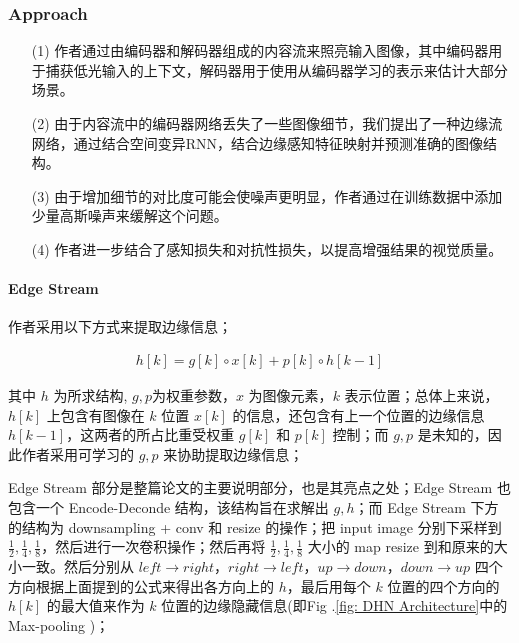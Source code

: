 \documentclass[a4paper, 10pt]{article}
\begin{document}
			\subsubsection{Approach}
			
			\begin{itemize}
				\item[(1)] 
				作者通过由编码器和解码器组成的内容流来照亮输入图像，其中编码器用于捕获低光输入的上下文，解码器用于使用从编码器学习的表示来估计大部分场景。
				
				\item[(2)]
				由于内容流中的编码器网络丢失了一些图像细节，我们提出了一种边缘流网络，通过结合空间变异RNN，结合边缘感知特征映射并预测准确的图像结构。
				
				\item[(3)]
				由于增加细节的对比度可能会使噪声更明显，作者通过在训练数据中添加少量高斯噪声来缓解这个问题。
				
				\item[(4)]
				作者进一步结合了感知损失和对抗性损失，以提高增强结果的视觉质量。
				
			\end{itemize}	
		
			\paragraph{Edge Stream}
			
			作者采用以下方式来提取边缘信息；
			
			\begin{equation}
				\begin{aligned}
					h \left[k\right] = g \left[k\right] \circ x \left[k\right] + p \left[k\right] \circ h \left[k-1\right]
				\end{aligned}
				\label{eq: max and avg}
			\end{equation}
			
		 	其中 $h$ 为所求结构, $g, p$为权重参数，$x$ 为图像元素，$k$ 表示位置；总体上来说，$h\left[k\right]$ 上包含有图像在 $k$ 位置 $x\left[k\right]$ 的信息，还包含有上一个位置的边缘信息 $h\left[k-1\right]$，这两者的所占比重受权重 $g\left[k\right]$ 和 $p\left[k\right]$ 控制；而 $g, p$ 是未知的，因此作者采用可学习的 $g, p$ 来协助提取边缘信息；
		 	
		 	Edge Stream 部分是整篇论文的主要说明部分，也是其亮点之处；Edge Stream 也包含一个 Encode-Deconde 结构，该结构旨在求解出 $g, h$；而 Edge Stream 下方的结构为 downsampling + conv 和 resize 的操作；把 input image 分别下采样到 $\frac{1}{2}, \frac{1}{4}, \frac{1}{8}$，然后进行一次卷积操作；然后再将 $\frac{1}{2}, \frac{1}{4}, \frac{1}{8}$ 大小的 map resize 到和原来的大小一致。然后分别从 $left \rightarrow right$，$right \rightarrow left$，$up \rightarrow down$，$down \rightarrow up$ 四个方向根据上面提到的公式来得出各方向上的 $h$，最后用每个 $k$ 位置的四个方向的 $h\left[k\right]$ 的最大值来作为 $k$ 位置的边缘隐藏信息(即Fig .\ref{fig: DHN Architecture}中的 Max-pooling )；
\end{document}
